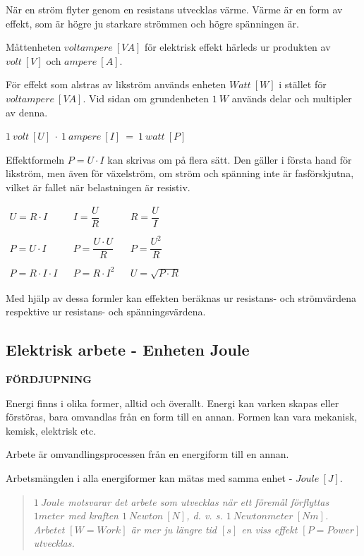 När en ström flyter genom en resistans utvecklas värme. Värme är en form av
effekt, som är högre ju starkare strömmen och högre spänningen är.

Måttenheten \(voltampere\ [VA]\) för elektrisk effekt härleds ur produkten av
\(volt\ [V]\) och \(ampere\ [A]\).

För effekt som alstras av likström används enheten \(Watt\ [W]\) i stället för
\(voltampere\ [VA]\). Vid sidan om grundenheten \(1\ W\) används delar och
multipler av denna.

\(1\ volt\ [U]\ \cdot\ 1\ ampere\ [I]\ =\ 1\ watt\ [P]\)

Effektformeln \(P = U \cdot I\) kan skrivas om på flera sätt. Den gäller i första
hand för likström, men även för växelström, om ström och spänning inte är
fasförskjutna, vilket är fallet när belastningen är resistiv.

\(
\begin{array}{lllll}
U = R \cdot I & & I = \dfrac{U}{R} & & R = \dfrac{U}{I}\\ \\
P = U \cdot I & & P = \dfrac{U \cdot U }{R} & & P = \dfrac{U^2}{R}\\ \\
P = R \cdot I \cdot I & & P = R \cdot I^2 & & U = \sqrt{P \cdot R}
\end{array}
\)

Med hjälp av dessa formler kan effekten beräknas ur resistans- och strömvärdena
respektive ur resistans- och spänningsvärdena.

\subsection{Elektrisk arbete - Enheten Joule}
\textbf{FÖRDJUPNING}

Energi finns i olika former, alltid och överallt. Energi kan varken skapas
eller förstöras, bara omvandlas från en form till en annan. Formen kan vara
mekanisk, kemisk, elektrisk etc.

Arbete är omvandlingsprocessen från en energiform till en annan.

Arbetsmängden i alla energiformer kan mätas med samma enhet - \(Joule\ [J]\).

\begin{quote}\emph{
\(1\ Joule\) motsvarar det arbete som utvecklas när ett föremål förflyttas
\(1 meter\) med kraften \(1\ Newton\ [N]\), d. v. s. \(1\ Newtonmeter\ [Nm]\).
Arbetet \([W=Work]\) är mer ju längre tid \([s]\) en viss effekt \([P=Power]\)
utvecklas.
}\end{quote}

